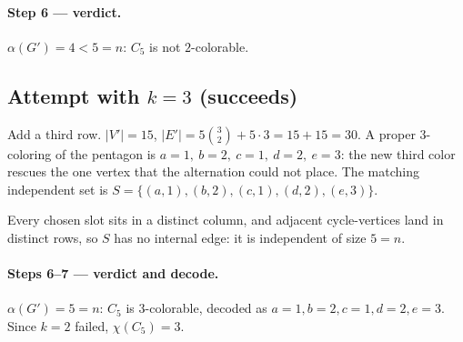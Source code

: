 \documentclass[11pt]{article}
\begin{document}
\paragraph{Step 6 --- verdict.} $\alpha(G')=4<5=n$: $C_5$ is not $2$-colorable.

\subsection{Attempt with $k=3$ (succeeds)}

Add a third row. $|V'|=15$, $|E'| = 5\binom{3}{2} + 5\cdot 3 = 15 + 15 = 30$. A
proper $3$-coloring of the pentagon is $a=1,\ b=2,\ c=1,\ d=2,\ e=3$: the new third
color rescues the one vertex that the alternation could not place. The matching
independent set is $S=\{(a,1),(b,2),(c,1),(d,2),(e,3)\}$.

\begin{center}
\end{center}

Every chosen slot sits in a distinct column, and adjacent cycle-vertices land in
distinct rows, so $S$ has no internal edge: it is independent of size $5=n$.

\paragraph{Steps 6--7 --- verdict and decode.} $\alpha(G')=5=n$: $C_5$ is
$3$-colorable, decoded as $a=1,b=2,c=1,d=2,e=3$. Since $k=2$ failed, $\chi(C_5)=3$.

\begin{center}
\end{center}
\end{document}
